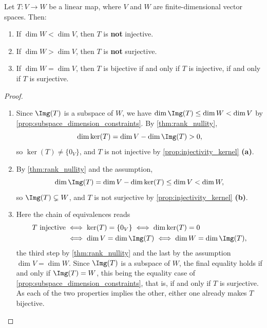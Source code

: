 \begin{corollary}
\label{cor:equal_dim_iso}
Let $T: V \to W$ be a linear map, where $V$ and $W$ are finite-di\-men\-sional vector spaces. Then:
\begin{enumerate}[label=\textbf{(\alph*)}]
    \item If $\dim W < \dim V$, then $T$ is \textbf{not} injective.
    \item If $\dim W > \dim V$, then $T$ is \textbf{not} surjective.
    \item If $\dim W = \dim V$, then $T$ is bijective if and only if $T$ is injective, if and only if $T$ is surjective.
\end{enumerate}
\end{corollary}

\begin{proof}
\begin{enumerate}[label=\textbf{(\alph*)}]
    \item Since $\Img(T)$ is a subspace of $W$, we have $\dim \Img(T) \le \dim W < \dim V$ by \cref{prop:subspace_dimension_constraints}. By \cref{thm:rank_nullity},
    \[
    \dim \ker(T) = \dim V - \dim \Img(T) > 0,
    \]
    so $\ker(T) \neq \{0_V\}$, and $T$ is not injective by \cref{prop:injectivity_kernel} \textbf{(a)}.
    \item By \cref{thm:rank_nullity} and the assumption,
    \[
    \dim \Img(T) = \dim V - \dim \ker(T) \le \dim V < \dim W,
    \]
    so $\Img(T) \subsetneq W$, and $T$ is not surjective by \cref{prop:injectivity_kernel} \textbf{(b)}.
    \item Here the chain of equivalences reads
    \begin{align*}
    T \text{ injective} &\iff \ker(T) = \{0_V\} \iff \dim \ker(T) = 0 \\
    &\iff \dim V = \dim \Img(T) \iff \dim W = \dim \Img(T),
    \end{align*}
    the third step by \cref{thm:rank_nullity} and the last by the assumption $\dim V = \dim W$. Since $\Img(T)$ is a subspace of $W$, the final equality holds if and only if $\Img(T) = W$, this being the equality case of \cref{prop:subspace_dimension_constraints}, that is, if and only if $T$ is surjective. As each of the two properties implies the other, either one already makes $T$ bijective. \qedhere
\end{enumerate}
\end{proof}


